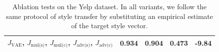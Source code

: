 \documentclass[letterpaper]{article} %
\newcommand{\loss}[1]{J_{\text{#1}}}
\begin{document}
\begin{table}[ht]
\begin{tabular}{| l || c | c | c | c |}
		\hline
		$\loss{VAE}$, $\loss{mul(s)}$, $\loss{mul(c)}$, $\loss{adv(s)}$, $\loss{adv(c)}$ & \textbf{0.934}  & 0.904             & \textbf{0.473} & \textbf{-9.84}  \\
		\hline
	\end{tabular}\vspace{-.2cm}
	\caption{Ablation tests on the Yelp dataset. In all variants, we follow the same protocol of style transfer by substituting an empirical estimate of the target style vector.}
	\label{tab:ablation-results}
\end{table}
\end{document}
